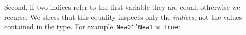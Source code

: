 \documentclass[9pt,preprint,authoryear]{sigplanconf}
\begin{document}
%
Second, if two indices refer to the first variable they are equal;
    otherwise we recurse. We stress that this equality inspects only the
    \emph{indices}, not the values contained in the type. For
    example{~}\textcolor[rgb]{0.70,0.13,0.13}{\texttt{New}}\textcolor[rgb]{0,0,0.80}{\texttt{\mbox{\hspace{0.50em}}}}\textcolor[rgb]{0.70,0.13,0.13}{\texttt{0}}\textcolor[rgb]{0,0,0.80}{\texttt{\mbox{\hspace{0.50em}}}}\textcolor[rgb]{0,0,0.80}{\texttt{{\char `\=}{\char `\=}}}\textcolor[rgb]{0,0,0.80}{\texttt{\mbox{\hspace{0.50em}}}}\textcolor[rgb]{0.70,0.13,0.13}{\texttt{New}}\textcolor[rgb]{0,0,0.80}{\texttt{\mbox{\hspace{0.50em}}}}\textcolor[rgb]{0.70,0.13,0.13}{\texttt{1}} is{~}\textcolor[rgb]{0.70,0.13,0.13}{\texttt{True}}{:}%


{\nopagebreak }
\end{document}

